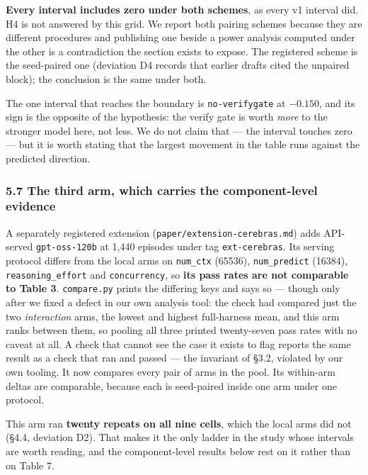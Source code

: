 \documentclass[
  10pt,
  a4paper,
]{article}
\let\oldtexttt\texttt
\renewcommand{\texttt}[1]{{\small\oldtexttt{#1}}}
\begin{document}
\textbf{Every interval includes zero under both schemes}, as every v1
interval did. H4 is not answered by this grid. We report both pairing
schemes because they are different procedures and publishing one beside
a power analysis computed under the other is a contradiction the section
exists to expose. The registered scheme is the seed-paired one
(deviation D4 records that earlier drafts cited the unpaired block); the
conclusion is the same under both.

The one interval that reaches the boundary is \texttt{no-verifygate} at
\(-0.150\), and its sign is the opposite of the hypothesis: the verify
gate is worth \emph{more} to the stronger model here, not less. We do
not claim that --- the interval touches zero --- but it is worth stating
that the largest movement in the table runs against the predicted
direction.

\subsubsection{5.7 The third arm, which carries the component-level
evidence}\label{the-third-arm-which-carries-the-component-level-evidence}

A separately registered extension (\texttt{paper/extension-cerebras.md})
adds API-served \texttt{gpt-oss-120b} at 1,440 episodes under tag
\texttt{ext-cerebras}. Its serving protocol differs from the local arms
on \texttt{num\_ctx} (65536), \texttt{num\_predict} (16384),
\texttt{reasoning\_effort} and \texttt{concurrency}, so \textbf{its pass
rates are not comparable to Table 3}. \texttt{compare.py} prints the
differing keys and says so --- though only after we fixed a defect in
our own analysis tool: the check had compared just the two
\emph{interaction} arms, the lowest and highest full-harness mean, and
this arm ranks between them, so pooling all three printed twenty-seven
pass rates with no caveat at all. A check that cannot see the case it
exists to flag reports the same result as a check that ran and passed
--- the invariant of §3.2, violated by our own tooling. It now compares
every pair of arms in the pool. Its within-arm deltas are comparable,
because each is seed-paired inside one arm under one protocol.

This arm ran \textbf{twenty repeats on all nine cells}, which the local
arms did not (§4.4, deviation D2). That makes it the only ladder in the
study whose intervals are worth reading, and the component-level results
below rest on it rather than on Table 7.
\end{document}
